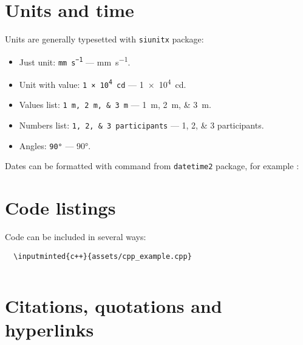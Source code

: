 \section{Units and time}
Units are generally typesetted with \texttt{siunitx} package:
\begin{itemize}
  \item Just unit: \texttt{\si{\milli\meter\per\second}} --- \si{\milli\meter\per\second}.
  \item Unit with value: \texttt{\SI{1e4}{\candela}} --- \SI{1e4}{\candela}.
  \item Values list: \texttt{\SIlist{1;2;3}{\meter}} --- \SIlist{1;2;3}{\meter}.
  \item Numbers list: \texttt{\numlist{1;2;3} participants} --- \numlist{1;2;3} participants.
  \item Angles: \texttt{\ang{90}} --- \ang{90}.
\end{itemize}

Dates can be formatted with \texttt{\DTMDate} command from \texttt{datetime2} package, for example \texttt{}:
\begin{mdframed}[style=example]
\end{mdframed}

\section{Code listings}
Code can be included in several ways:
\begin{verbatim}
  \inputminted{c++}{assets/cpp_example.cpp}
\end{verbatim}
\begin{mdframed}[style=example]
  \inputminted{c++}{assets/cpp_example.cpp}
\end{mdframed}

\section{Citations, quotations and hyperlinks}
